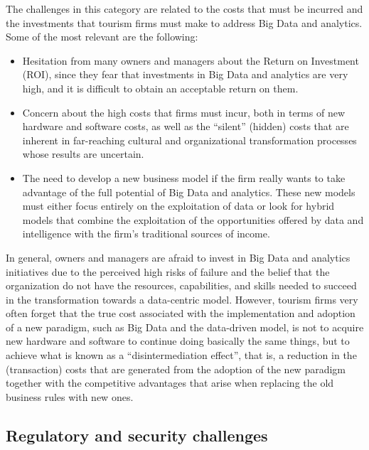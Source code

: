 \documentclass[
  letterpaper,
  DIV=11,
  numbers=noendperiod]{scrreprt}
\begin{document}
The challenges in this category are related to the costs that must be
incurred and the investments that tourism firms must make to address Big
Data and analytics. Some of the most relevant are the following:

\begin{itemize}
\item
  Hesitation from many owners and managers about the Return on
  Investment (ROI), since they fear that investments in Big Data and
  analytics are very high, and it is difficult to obtain an acceptable
  return on them.
\item
  Concern about the high costs that firms must incur, both in terms of
  new hardware and software costs, as well as the ``silent'' (hidden)
  costs that are inherent in far-reaching cultural and organizational
  transformation processes whose results are uncertain.
\item
  The need to develop a new business model if the firm really wants to
  take advantage of the full potential of Big Data and analytics. These
  new models must either focus entirely on the exploitation of data or
  look for hybrid models that combine the exploitation of the
  opportunities offered by data and intelligence with the firm's
  traditional sources of income.
\end{itemize}

In general, owners and managers are afraid to invest in Big Data and
analytics initiatives due to the perceived high risks of failure and the
belief that the organization do not have the resources, capabilities,
and skills needed to succeed in the transformation towards a
data-centric model. However, tourism firms very often forget that the
true cost associated with the implementation and adoption of a new
paradigm, such as Big Data and the data-driven model, is not to acquire
new hardware and software to continue doing basically the same things,
but to achieve what is known as a ``disintermediation effect'', that is,
a reduction in the (transaction) costs that are generated from the
adoption of the new paradigm together with the competitive advantages
that arise when replacing the old business rules with new ones.

\hypertarget{regulatory-and-security-challenges}{%
\subsection{Regulatory and security
challenges}\label{regulatory-and-security-challenges}}
\end{document}
